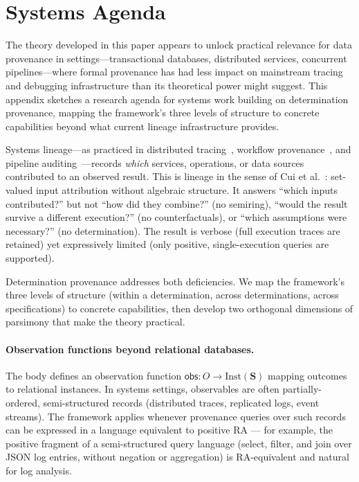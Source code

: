 
\section{Systems Agenda}
\label{app:systems-lineage}
\label{app:certificates}

The theory developed in this paper appears to unlock practical
relevance for data provenance in settings---transactional databases,
distributed services, concurrent pipelines---where formal provenance
has had less impact on mainstream tracing and debugging infrastructure
than its theoretical power might suggest.
This appendix sketches a research agenda for systems work building on
determination provenance, mapping the framework's three levels of
structure to concrete capabilities beyond what current lineage
infrastructure provides.

Systems lineage---as practiced in distributed
tracing~\cite{sigelman2010dapper}, workflow
provenance~\cite{seltzer2005provenance}, and pipeline
auditing~\cite{bates2015trustworthy}---records \emph{which} services,
operations, or data sources contributed to an observed result.
This is lineage in the sense of Cui et al.~\cite{cui2000lineage}:
set-valued input attribution without algebraic structure.
It answers ``which inputs contributed?'' but not
``how did they combine?'' (no semiring), ``would the result
survive a different execution?'' (no counterfactuals), or ``which
assumptions were necessary?'' (no determination).
The result is verbose (full execution traces are retained) yet
expressively limited (only positive, single-execution queries are
supported).

Determination provenance addresses both deficiencies.
We map the framework's three levels of structure
(within a determination, across determinations, across specifications)
to concrete capabilities, then develop two orthogonal
dimensions of parsimony that make the theory practical.

\paragraph{Observation functions beyond relational databases.}
The body defines an observation function
$\mathsf{obs}: O \to \mathrm{Inst}(\mathbf{S})$ mapping outcomes to
relational instances.
In systems settings, observables are often partially-ordered,
semi-structured records (distributed traces, replicated logs, event
streams).
The framework applies whenever provenance queries over such records
can be expressed in a language equivalent to positive RA --- for
example, the positive fragment of a semi-structured query language
(select, filter, and join over JSON log entries, without negation or
aggregation) is RA-equivalent and natural for log analysis.

